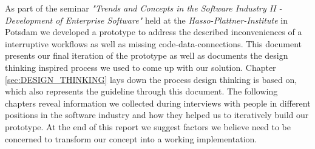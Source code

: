 As part of the seminar \emph{"Trends and Concepts in the Software Industry II - Development of Enterprise Software"} held at the \emph{Hasso-Plattner-Institute} in Potsdam we developed a prototype to address the described inconveniences of a interruptive workflows as well as missing code-data-connections. This document presents our final iteration of the prototype as well as documents the design thinking inspired process we used to come up with our solution. Chapter \ref{sec:DESIGN_THINKING} lays down the process design thinking is based on, which also represents the guideline through this document. The following chapters reveal information we collected during interviews with people in different positions in the software industry and how they helped us to iteratively build our prototype. At the end of this report we suggest factors we believe need to be concerned to transform our concept into a working implementation.